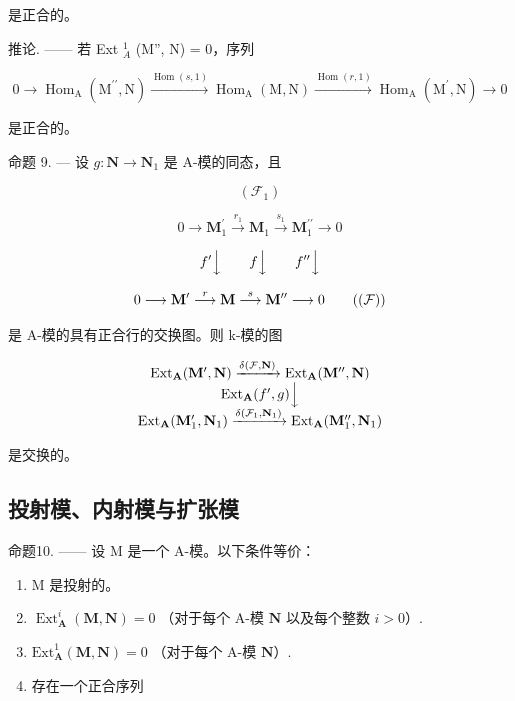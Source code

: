 是正合的。

推论. —— 若 Ext \(_{A}^{1}\) (M'', N) = 0，序列

\[
0 \longrightarrow \operatorname{Hom} _ {\mathrm{A}} \left(\mathrm{M} ^ {\prime \prime}, \mathrm{N}\right) \xrightarrow {\operatorname{Hom} (s , 1)} \operatorname{Hom} _ {\mathrm{A}} (\mathrm{M}, \mathrm{N}) \xrightarrow {\operatorname{Hom} (r , 1)} \operatorname{Hom} _ {\mathrm{A}} \left(\mathrm{M} ^ {\prime}, \mathrm{N}\right) \longrightarrow 0
\]

是正合的。

命题 9. --- 设 \(g: \mathbf{N} \to \mathbf{N}_1\) 是 A-模的同态，且

\[
(\mathcal {F} _ {1})
\]

\[
0 \longrightarrow \mathbf {M} _ {1} ^ {\prime} \xrightarrow {r _ {1}} \mathbf {M} _ {1} \xrightarrow {s _ {1}} \mathbf {M} _ {1} ^ {\prime \prime} \longrightarrow 0
\]

\[
f ^ {\prime} \Big \downarrow \qquad f \Big \downarrow \qquad f ^ {\prime \prime} \Big \downarrow
\]

\[
0 \longrightarrow \mathbf {M} ^ {\prime} \stackrel {r} {\longrightarrow} \mathbf {M} \stackrel {s} {\longrightarrow} \mathbf {M} ^ {\prime \prime} \longrightarrow 0\tag{$(\mathcal{F})$}
\]

是 A-模的具有正合行的交换图。则 k-模的图

\[
\begin{array}{c} \operatorname{Ext} _ {\mathbf {A}} (\mathbf {M} ^ {\prime}, \mathbf {N}) \xrightarrow {\delta (\mathcal {F} , \mathbf {N})} \operatorname{Ext} _ {\mathbf {A}} (\mathbf {M} ^ {\prime \prime}, \mathbf {N}) \\ \operatorname{Ext} _ {\mathbf {A}} (f ^ {\prime}, g) \Big \downarrow \\ \operatorname{Ext} _ {\mathbf {A}} (\mathbf {M} _ {1} ^ {\prime}, \mathbf {N} _ {1}) \xrightarrow {\delta (\mathcal {F} _ {1} , \mathbf {N} _ {1})} \operatorname{Ext} _ {\mathbf {A}} (\mathbf {M} _ {1} ^ {\prime \prime}, \mathbf {N} _ {1}) \end{array}
\]

是交换的。

\subsection{投射模、内射模与扩张模}

命题10. —— 设 M 是一个 A-模。以下条件等价：

\begin{enumerate}
\def\labelenumi{(\roman{enumi})}
\item
  M 是投射的。
\item
  \(\operatorname{Ext}_{\mathbf{A}}^{i}(\mathbf{M},\mathbf{N}) = 0\) （对于每个 A-模 \(\mathbf{N}\) 以及每个整数 \(i > 0\)）.
\item
  \(\mathrm{Ext}_{\mathbf{A}}^{1}(\mathbf{M},\mathbf{N}) = 0\) （对于每个 A-模 \(\mathbf{N}\)）.
\item
  存在一个正合序列
\end{enumerate}

